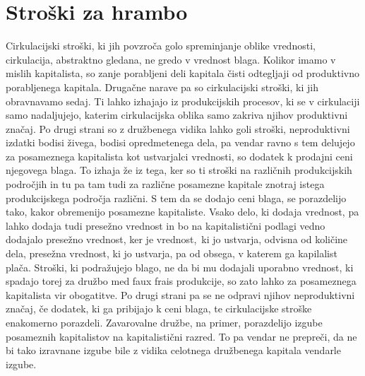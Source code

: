 \documentclass[kapital_02.tex]{subfiles}
\begin{document}
\section{Stroški za hrambo}
Cirkulacijski stroški, ki jih povzroča golo spreminjanje oblike vrednosti, cirkulacija, abstraktno gledana, ne gredo v vrednost blaga.
Kolikor imamo v mislih kapitalista, so zanje porabljeni deli kapitala čisti odtegljaji od produktivno porabljenega kapitala.
Drugačne narave pa so cirkulacijski stroški, ki jih obravnavamo sedaj.
Ti lahko izhajajo iz produkcijskih procesov, ki se v cirkulaciji samo nadaljujejo, katerim cirkulacijska oblika samo zakriva njihov produktivni značaj.
Po drugi strani so z družbenega vidika lahko goli stroški, neproduktivni izdatki bodisi živega, bodisi opredmetenega dela, pa vendar ravno s tem delujejo za posameznega kapitalista kot ustvarjalci vrednosti, so dodatek k prodajni ceni njegovega blaga.
To izhaja že iz tega, ker so ti stroški na različnih produkcijskih področjih in tu pa tam tudi za različne posamezne kapitale znotraj istega produkcijskega področja različni.
S tem da se dodajo ceni blaga, se porazdelijo tako, kakor obremenijo posamezne kapitaliste.
Vsako delo, ki dodaja vrednost, pa lahko dodaja tudi presežno vrednost in bo na kapitalistični podlagi vedno dodajalo presežno vrednost, ker je vrednost,\KPEstran\ ki jo ustvarja, odvisna od količine dela, presežna vrednost, ki jo ustvarja, pa od obsega, v katerem ga kapilalist plača.
Stroški, ki podražujejo blago, ne da bi mu dodajali uporabno vrednost, ki spadajo torej za družbo med faux frais produkcije, so zato lahko za posameznega kapitalista vir obogatitve.
Po drugi strani pa se ne odpravi njihov neproduktivni značaj, če dodatek, ki ga pribijajo k ceni blaga, te cirkulacijske stroške enakomerno porazdeli.
Zavarovalne družbe, na primer, porazdelijo izgube posameznih kapitalistov na kapitalistični razred.
To pa vendar ne prepreči, da ne bi tako izravnane izgube bile z vidika celotnega družbenega kapitala vendarle izgube.
\end{document}
